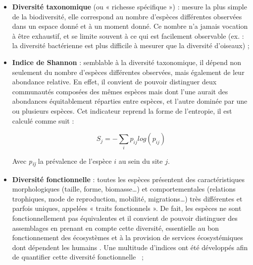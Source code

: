 \begin{itemize}
    \item \textbf{Diversité taxonomique} (ou « richesse spécifique ») : mesure la plus simple de la biodiversité, elle correspond au nombre d’espèces différentes observées dans un espace donné et à un moment donné. Ce nombre n’a jamais vocation à être exhaustif, et se limite souvent à ce qui est facilement observable (ex. : la diversité bactérienne est plus difficile à mesurer que la diversité d’oiseaux) ;
    
    \item \textbf{Indice de Shannon} \citep{magurran_measuring_2004} : semblable à la diversité taxonomique, il dépend non seulement du nombre d’espèces différentes observées, mais également de leur abondance relative. En effet, il convient de pouvoir distinguer deux communautés composées des mêmes espèces mais dont l’une aurait des abondances équitablement réparties entre espèces, et l’autre dominée par une ou plusieurs espèces. Cet indicateur reprend la forme de l’entropie, il est calculé comme suit :
    
    \begin{equation}
	    S_j=-\sum_{i}p_{ij} log(p_{ij})
	    \label{eqintro.1}
    \end{equation}
    
    Avec \textit{p\textsubscript{ij}} la prévalence de l’espèce $i$ au sein du site $j$.
    
    \item \textbf{Diversité fonctionnelle} : toutes les espèces présentent des caractéristiques morphologiques (taille, forme, biomasse…) et comportementales (relations trophiques, mode de reproduction, mobilité, migrations…) très différentes et parfois uniques, appelées « traits fonctionnels ». De fait, les espèces ne sont fonctionnellement pas équivalentes et il convient de pouvoir distinguer des assemblages en prenant en compte cette diversité, essentielle au bon fonctionnement des écosystèmes et à la provision de services écosystémiques dont dépendent les humains \citep{hooper_effects_2005, cadotte_using_2009, clemente_identifying_2010, faith_evosystem_2010}. Une multitude d’indices ont été développés afin de quantifier cette diversité fonctionnelle \citep{petchey_functional_2002, magurran_measuring_2004, mouchet_towards_2008, villeger_new_2008}~;
    

\end{itemize}
